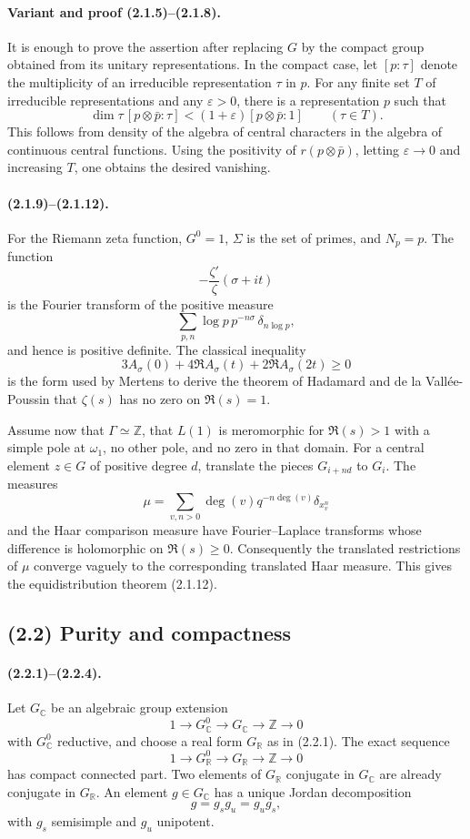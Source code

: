 \documentclass[11pt]{article}
\theoremstyle{remark}
\newcommand{\ZZ}{\mathbb{Z}}
\newcommand{\CC}{\mathbb{C}}
\newcommand{\RR}{\mathbb{R}}
\begin{document}
\paragraph{Variant and proof (2.1.5)--(2.1.8).}
It is enough to prove the assertion after replacing \(G\) by the compact group obtained from its unitary representations. In the compact case, let \([p:\tau]\) denote the multiplicity of an irreducible representation \(\tau\) in \(p\). For any finite set \(T\) of irreducible representations and any \(\varepsilon>0\), there is a representation \(p\) such that
\[
\dim \tau\,[p\otimes\bar p:\tau]<(1+\varepsilon)[p\otimes\bar p:1]
\qquad(\tau\in T).
\]
This follows from density of the algebra of central characters in the algebra of continuous central functions. Using the positivity of \(r(p\otimes\bar p)\), letting \(\varepsilon\to0\) and increasing \(T\), one obtains the desired vanishing.

\paragraph{(2.1.9)--(2.1.12).}
For the Riemann zeta function, \(G^0=1\), \(\Sigma\) is the set of primes, and \(N_p=p\). The function
\[
-\frac{\zeta'}{\zeta}(\sigma+it)
\]
is the Fourier transform of the positive measure
\[
\sum_{p,n}\log p\,p^{-n\sigma}\,\delta_{n\log p},
\]
and hence is positive definite. The classical inequality
\[
3A_\sigma(0)+4\Re A_\sigma(t)+2\Re A_\sigma(2t)\ge0
\]
is the form used by Mertens to derive the theorem of Hadamard and de la Vallée-Poussin that \(\zeta(s)\) has no zero on \(\Re(s)=1\).

Assume now that \(\Gamma\simeq\ZZ\), that \(L(1)\) is meromorphic for \(\Re(s)>1\) with a simple pole at \(\omega_1\), no other pole, and no zero in that domain. For a central element \(z\in G\) of positive degree \(d\), translate the pieces \(G_{i+nd}\) to \(G_i\). The measures
\[
\mu=\sum_{v,n>0}\deg(v)q^{-n\deg(v)}\delta_{x_v^n}
\]
and the Haar comparison measure have Fourier--Laplace transforms whose difference is holomorphic on \(\Re(s)\ge0\). Consequently the translated restrictions of \(\mu\) converge vaguely to the corresponding translated Haar measure. This gives the equidistribution theorem (2.1.12).

\subsection*{(2.2) Purity and compactness}

\paragraph{(2.2.1)--(2.2.4).}
Let \(G_\CC\) be an algebraic group extension
\[
1\longrightarrow G^0_\CC\longrightarrow G_\CC\longrightarrow \ZZ\longrightarrow 0
\]
with \(G^0_\CC\) reductive, and choose a real form \(G_\RR\) as in (2.2.1). The exact sequence
\[
1\longrightarrow G^0_\RR\longrightarrow G_\RR\longrightarrow \ZZ\longrightarrow 0
\]
has compact connected part. Two elements of \(G_\RR\) conjugate in \(G_\CC\) are already conjugate in \(G_\RR\). An element \(g\in G_\CC\) has a unique Jordan decomposition
\[
g=g_sg_u=g_ug_s,
\]
with \(g_s\) semisimple and \(g_u\) unipotent.
\end{document}
